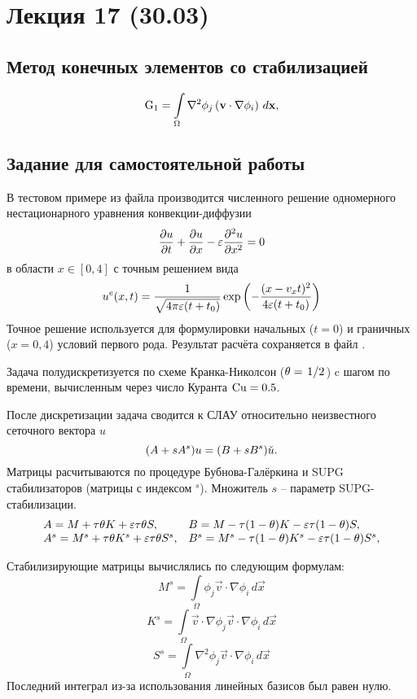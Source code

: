 \section{Лекция 17 (30.03)}

\subsection{Метод конечных элементов со стабилизацией}
\begin{equation}
\label{eq:fem_supg_g1}
{\rm G}_1 = \int\limits_{\Omega}\nabla^2 \phi_j \left(\boldsymbol{\rm v} \cdot \nabla \phi_i\right) \, d \boldsymbol{\rm x},
\end{equation}

\subsection{Задание для самостоятельной работы}
\label{sec:hw_supg}
В тестовом примере 
из файла 
производится численного решение одномерного нестационарного уравнения конвекции-диффузии
$$
\frac{\partial u}{\partial t} + \frac{\partial u}{\partial x} - \varepsilon \frac{\partial^2 u}{\partial x^2} = 0
$$
в области $x\in[0, 4]$
с точным решением вида
$$
u^e(x, t) = \frac{1}{\sqrt{4\pi \varepsilon (t + t_0)}} \exp\left(-\frac{(x - v_x t)^2}{4\varepsilon(t+t_0)}\right)
$$
Точное решение используется для формулировки начальных ($t=0$) и граничных ($x=0,4$) условий первого рода.
Результат расчёта сохраняется в файл .

Задача полудискретизуется по схеме Кранка-Николсон ($\theta=\left.1\middle/2\right.$) c шагом по времени, вычисленным через число Куранта $\rm Cu = 0.5$.

После дискретизации задача сводится к СЛАУ относительно неизвестного сеточного вектора $u$
$$
(A + s A^s) u = (B + s B^s) \check u. \\
$$
Матрицы расчитываются по процедуре Бубнова-Галёркина и SUPG стабилизаторов (матрицы с индексом $^s$).
Множитель $s$ -- параметр SUPG-стабилизации.
$$
\begin{array}{ll}
A = M + \tau\theta K + \varepsilon\tau\theta S, &
B = M - \tau(1-\theta)K - \varepsilon\tau(1-\theta) S, \\
A^s = M^s + \tau\theta K^s + \varepsilon\tau\theta S^s, &
B^s = M^s - \tau(1-\theta)K^s - \varepsilon\tau (1-\theta) S^s, \\
\end{array}
$$

Стабилизирующие матрицы вычислялись по следующим формулам:
$$
M^s = \int\limits_\Omega \phi_j \vec v \cdot \nabla \phi_i \, d\vec x
$$
$$
K^s = \int\limits_\Omega \vec v \cdot \nabla \phi_j \vec v \cdot \nabla \phi_i \, d\vec x
$$
$$
S^s = \int\limits_\Omega \nabla^2 \phi_j \vec v \cdot \nabla \phi_i \, d\vec x
$$
Последний интеграл из-за использования линейных базисов был равен нулю.

